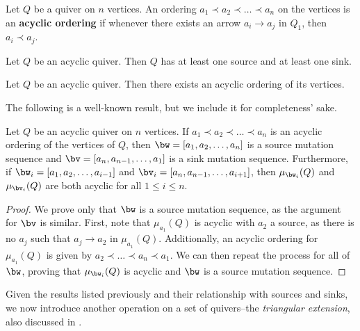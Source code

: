 \begin{defi}{\cite{MR3822733}} \label{def-acyclic-ordering}
    Let $Q$ be a quiver on $n$ vertices.
    An ordering $a_1 \prec a_2 \prec \dots \prec a_n$ on the vertices is an \textbf{acyclic ordering} if whenever there exists an arrow $a_i \to a_j$ in $Q_1$, then $a_i \prec a_j$.
\end{defi}

\begin{prop}{\cite[Proposition 3.1.1]{MR3822733}} \label{prop-acyclic-source-sink}
    Let $Q$ be an acyclic quiver.
    Then $Q$ has at least one source and at least one sink.
\end{prop}

\begin{prop}{\cite[Proposition 3.1.2]{MR3822733}} \label{prop-acyclic-ordering}
    Let $Q$ be an acyclic quiver.
    Then there exists an acyclic ordering of its vertices.
\end{prop}

The following is a well-known result, but we include it for completeness' sake.

\begin{lemm} \label{lem-acyclic-source-sink}
    Let $Q$ be an acyclic quiver on $n$ vertices.
    If $a_1 \prec a_2 \prec \dots \prec a_n$ is an acyclic ordering of the vertices of $Q$, then $\bw = [a_1, a_2, \dots, a_n]$ is a source mutation sequence and $\bv = [a_n, a_{n-1}, \dots, a_1]$ is a sink mutation sequence.
    Furthermore, if $\bw_i = [a_1, a_2, \dots, a_{i-1}]$ and $\bv_i = [a_n, a_{n-1}, \dots, a_{i+1}]$, then $\mu_{\bw_i}(Q)$ and $\mu_{\bv_i}(Q)$ are both acyclic for all $1 \leq i \leq n$.
\end{lemm}


\begin{proof}
    We prove only that $\bw$ is a source mutation sequence, as the argument for $\bv$ is similar.
    First, note that $\mu_{a_1}(Q)$ is acyclic with $a_2$ a source, as there is no $a_j$ such that $a_j \to a_2$ in $\mu_{a_1}(Q)$.
    Additionally, an acyclic ordering for $\mu_{a_1}(Q)$ is given by $a_2 \prec \dots \prec a_n \prec a_1$.
    We can then repeat the process for all of $\bw$, proving that $\mu_{\bw_i}(Q)$ is acyclic and $\bw$ is a source mutation sequence.
\end{proof}

Given the results listed previously and their relationship with sources and sinks, we now introduce another operation on a set of quivers--the \textit{triangular extension}, also discussed in \cite{bucher_banff_2021, kontsevich_stability_2008, ladkani_cluster_2013}.

